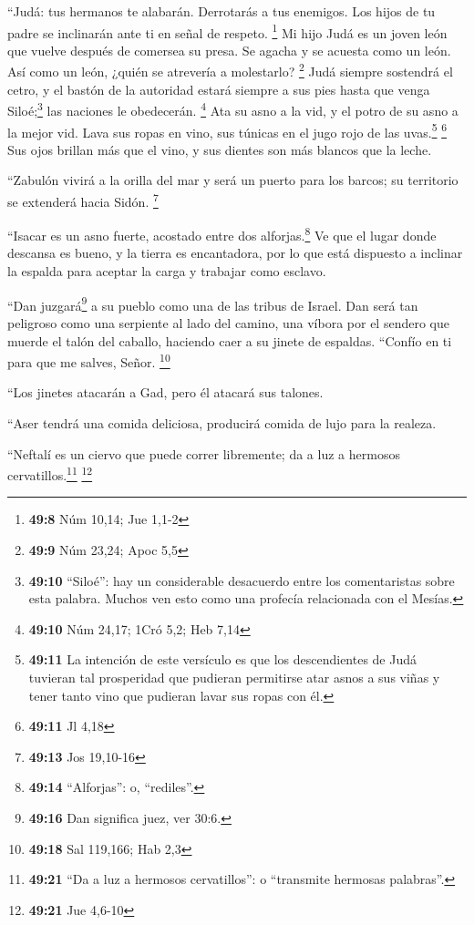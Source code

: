  ``Judá: tus hermanos te alabarán. Derrotarás a tus
enemigos. Los hijos de tu padre se inclinarán ante ti en señal de
respeto. \footnote{\textbf{49:8} Núm 10,14; Jue 1,1-2}  Mi
hijo Judá es un joven león que vuelve después de comersea su presa. Se
agacha y se acuesta como un león. Así como un león, ¿quién se atrevería
a molestarlo? \footnote{\textbf{49:9} Núm 23,24; Apoc 5,5}
 Judá siempre sostendrá el cetro, y el bastón de la
autoridad estará siempre a sus pies hasta que venga Siloé;\footnote{\textbf{49:10}
  ``Siloé'': hay un considerable desacuerdo entre los comentaristas
  sobre esta palabra. Muchos ven esto como una profecía relacionada con
  el Mesías.} las naciones le obedecerán. \footnote{\textbf{49:10} Núm
  24,17; 1Cró 5,2; Heb 7,14}  Ata su asno a la vid, y el
potro de su asno a la mejor vid. Lava sus ropas en vino, sus túnicas en
el jugo rojo de las uvas.\footnote{\textbf{49:11} La intención de este
  versículo es que los descendientes de Judá tuvieran tal prosperidad
  que pudieran permitirse atar asnos a sus viñas y tener tanto vino que
  pudieran lavar sus ropas con él.} \footnote{\textbf{49:11} Jl 4,18}
 Sus ojos brillan más que el vino, y sus dientes son más
blancos que la leche.

 ``Zabulón vivirá a la orilla del mar y será un puerto
para los barcos; su territorio se extenderá hacia Sidón. \footnote{\textbf{49:13}
  Jos 19,10-16}

 ``Isacar es un asno fuerte, acostado entre dos
alforjas.\footnote{\textbf{49:14} ``Alforjas'': o, ``rediles''.}
 Ve que el lugar donde descansa es bueno, y la tierra es
encantadora, por lo que está dispuesto a inclinar la espalda para
aceptar la carga y trabajar como esclavo.

 ``Dan juzgará\footnote{\textbf{49:16} Dan significa
  juez, ver 30:6.} a su pueblo como una de las tribus de Israel.
 Dan será tan peligroso como una serpiente al lado del
camino, una víbora por el sendero que muerde el talón del caballo,
haciendo caer a su jinete de espaldas.  ``Confío en ti
para que me salves, Señor. \footnote{\textbf{49:18} Sal 119,166; Hab 2,3}

 ``Los jinetes atacarán a Gad, pero él atacará sus
talones.

 ``Aser tendrá una comida deliciosa, producirá comida de
lujo para la realeza.

 ``Neftalí es un ciervo que puede correr libremente; da a
luz a hermosos cervatillos.\footnote{\textbf{49:21} ``Da a luz a
  hermosos cervatillos'': o ``transmite hermosas palabras''.}
\footnote{\textbf{49:21} Jue 4,6-10}

